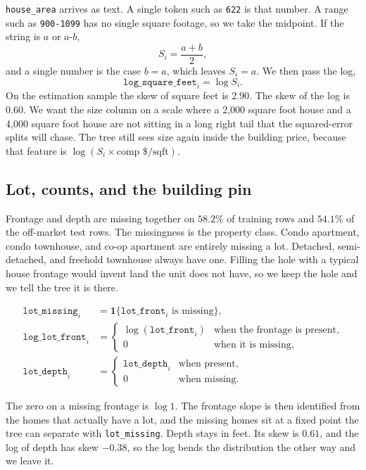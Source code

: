 \documentclass[11pt]{article}
\begin{document}
\texttt{house\_area} arrives as text. A single token such as \texttt{622} is that number. A range such as \texttt{900-1099} has no single square footage, so we take the midpoint. If the string is \(a\) or \(a\)-\(b\),
\[
S_i = \frac{a+b}{2},
\]
and a single number is the case \(b = a\), which leaves \(S_i = a\). We then pass the log,
\[
\texttt{log\_square\_feet}_i = \log S_i.
\]
On the estimation sample the skew of square feet is \(2.90\). The skew of the log is \(0.60\). We want the size column on a scale where a 2{,}000 square foot house and a 4{,}000 square foot house are not sitting in a long right tail that the squared-error splits will chase. The tree still sees size again inside the building price, because that feature is \(\log(S_i \times \text{comp \$/sqft})\).

\subsection{Lot, counts, and the building pin}

Frontage and depth are missing together on \(58.2\%\) of training rows and \(54.1\%\) of the off-market test rows. The missingness is the property class. Condo apartment, condo townhouse, and co-op apartment are entirely missing a lot. Detached, semi-detached, and freehold townhouse always have one. Filling the hole with a typical house frontage would invent land the unit does not have, so we keep the hole and we tell the tree it is there.

\begin{align*}
\texttt{lot\_missing}_i &= \mathbf{1}\{\texttt{lot\_front}_i \text{ is missing}\},\\
\texttt{log\_lot\_front}_i &=
\begin{cases}
\log(\texttt{lot\_front}_i) & \text{when the frontage is present},\\
0 & \text{when it is missing},
\end{cases}\\
\texttt{lot\_depth}_i &=
\begin{cases}
\texttt{lot\_depth}_i & \text{when present},\\
0 & \text{when missing}.
\end{cases}
\end{align*}

The zero on a missing frontage is \(\log 1\). The frontage slope is then identified from the homes that actually have a lot, and the missing homes sit at a fixed point the tree can separate with \texttt{lot\_missing}. Depth stays in feet. Its skew is \(0.61\), and the log of depth has skew \(-0.38\), so the log bends the distribution the other way and we leave it.
\end{document}
